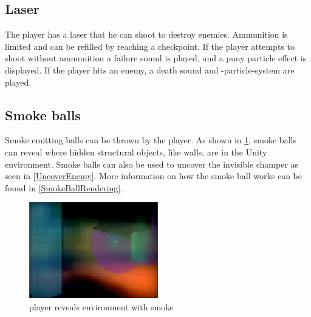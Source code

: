\subsection{Laser}
The player has a laser that he can shoot to destroy enemies. Ammunition is limited and can be refilled by reaching a checkpoint. If the player attempts to shoot without ammunition a failure sound is played, and a puny particle effect is displayed. If the player hits an enemy, a death sound and -particle-system are played.



\subsection{Smoke balls}
Smoke emitting  balls can be thrown by the player. As shown in \cref{SmokeInEnvironment}, smoke balls can reveal where hidden structural objects, like walls, are in the Unity environment. Smoke balls can also be used to uncover the invisible champer as seen in \cref{UncoverEnemy}. More information on how the smoke ball works can be found in \cref{SmokeBallRendering}.


\begin{figure}
  \centering
  \includegraphics[width=0.5\textwidth]{images/game_systems/ThrowSmoke.png}
  \caption{player reveals environment with smoke}
  \label{SmokeInEnvironment}
\end{figure}


